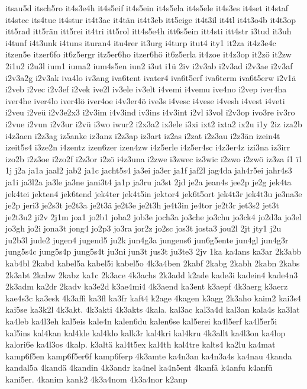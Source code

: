 {itsau5d
itsch5ro
it4s3e4h
it4s5eif
it4s5ein
it4s5ela
it4s5ele
it4s3es
it4set
it4staf
it4stec
its4tue
it4stur
it4t3ac
it4tän
it4t3eb
itt5eige
it4t3il
it4tl
it4t3o4b
it4t3op
itt5rad
itt5rän
itt5rei
it4tri
itt5rol
itt4s5e4h
itt6s5ein
itt4sti
itt4str
i3tud
it3uh
i4tunf
i4t3unk
i4tuns
ituran4
itu4rer
it3urg
i4turp
itut4
ity1
it2za
it4z3e4c
itzen5e
itzer6fo
it6z5ergr
itz5er6ho
itzer6hö
it6z5erla
it4zoe
it4z3op
it2zö
it2zw
2i1u2
i2u3l
ium1
iuma2
ium4s5en
iun2
i3ut
i1ü
2iv
i2v3ab
i2v3ad
i2v3ae
i2v3af
i2v3a2g
i2v3ak
iva4lo
iv3ang
iva6tent
ivater4
iva6t5erf
iva6term
iva6t5erw
i2v1ä
i2veb
i2vec
i2v3ef
i2vek
ive2l
iv3ele
iv3elt
i4vemi
i4vemu
ive4no
i2vep
iver4ha
iver4he
iver4lo
iver4lö
iver4oe
i4v3er4ö
ive3s
i4vesc
i4vese
i4vesh
i4vest
i4veti
i2veu
i2veü
i2v3e2x3
i2v3im
i4v3ind
iv3ins
i4v3int
i2vl
i3vol
i2v3op
ivo3re
iv3ro
i2vue
i2vun
i2v3ur
i2vü
i3wo
iwur2
i2x3a2
ix3ele
i3xi
ixt2
ixta2
ix2u
i1y
2iz
iza2b
i4z3aen
i2z3ag
iz5anke
iz3anz
i2z3ap
iz3art
iz2as
i2zat
i2z3au
i2z3än
izein4t
izeit5s4
i3ze2n
i4zentz
izen6zer
izen4zw
i4z5erle
i4z5er4sc
i4z3er4z
izi3na
iz3irr
izo2b
i2z3oe
i2zo2f
i2z3or
i2zö
i4z3una
i2zwe
i3zwec
iz3wic
i2zwo
i2zwö
iz3za
í1
ï1
1j
j2a
ja1a
jaal2
jab2
ja1c
jacht5s4
ja3ei
ja3er
ja1f
jaf2l
jag4da
jah4r5ei
jahr4s3
ja1i
ja3l2a
ja3le
ja3ne
jani3t4
ja1p
ja3ru
ja3st
2jd
je2a
jean4s
jee2p
je2g
jek4ta
jek4tei
jekten4
jek6tend
jek4ter
jek4t5in
jektor4
jek6t5ort
jek4t3r
jek4t3u
je3na3e
je2p
jeri3
je2s3t
je2t3a
je2t3ä
je2t3e
je2t3h
je4t3in
je4tor
je2t3r
jet3s2
jet3t
je2t3u2
ji2v
2j1m
joa1
jo2b1
joba2
job3e
joch3a
jo3che
jo3chu
jo3ck4
jo2d3a
jo3el
jo3gh
jo2i
jona3t
jong4
jo2p3
jo3ra
jor2z
jo2sc
jos3t
josta3
jou2l
2jt
jty1
j2u
ju2b3l
jude2
jugen4
jugend5
ju2k
jun4g3a
jungens6
jun6g5ente
jun4gl
jun4g3r
jung5s4c
jung5s4p
jung5s4t
ju3ni
jun3t
jus3t
ju3te3
2jv
1ka
ka4ans
ka3ar
2k3abb
kab4bl
2kabd
kabel5a
kabel5i
kabel5o
4k3a4ben
2kabf
2kabg
2kabh
2kabn
2kabs
2k3abt
2kabw
2kabz
ka1c
2k3ace
4k3achs
2k3add
k2ade
kade3i
kadein4
kade4n3
2k3adm
ka2dr
2kadv
ka3e2d
k3ae4mi4
4k3aend
ka3ent
k3aepf
4k3aerg
k3aerz
kae4s3c
ka3esk
4k3affi
ka3fl
ka3fr
kaft4
k2age
4kagen
k3agg
2k3aho
kaim2
kai3s4
kai5se
ka3k2l
4k3akt.
4k3akti
4k3akts
4kala.
kal3ac
kal3a4d
kal3an
kala4s
ka3lat
ka4leb
ka4l3eh
kal5eis
kale4n
kalen6du
kalen6se
kal5erei
ka4l5erf
ka4l5er5i
kal5ins
kal4kan
kal4kle
kal4klo
kalk3r
kal4kri
kal4kru
4k3allt
ka4l3on
ka4lop
kalori6e
ka4l3os
4kalp.
k3altä
kal4t5ex
kal4th
kal4tre
kalts4
ka2lu
ka4mat
kamp6f5en
kamp6f5er6f
kamp6ferp
4k3amte
ka4n3an
ka4n3a4s
ka4nau
4kanda
kandal5a
4kandä
4kandin
4k3andr
ka4nel
ka4n5ent
4kanfä
k4anfu
k4anfü
kani5er.
4kanim
kank2
4k3a4nom
4k3a4nor
k2anp
}
